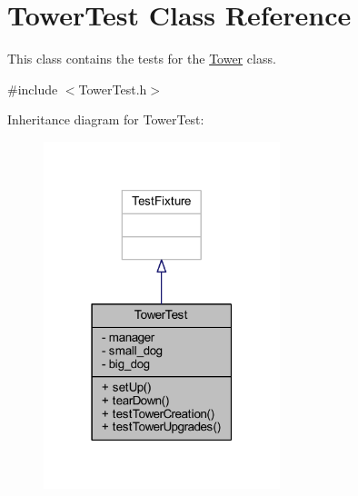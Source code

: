 \hypertarget{class_tower_test}{\section{Tower\+Test Class Reference}
\label{class_tower_test}
}


This class contains the tests for the \hyperlink{class_tower}{Tower} class.  




{\ttfamily \#include $<$Tower\+Test.\+h$>$}



Inheritance diagram for Tower\+Test\+:\nopagebreak
\begin{figure}[H]
\begin{center}
\leavevmode
\includegraphics[width=195pt]{class_tower_test__inherit__graph}
\end{center}
\end{figure}


